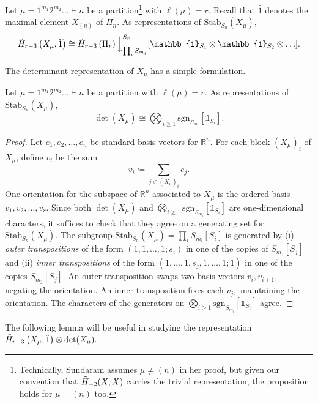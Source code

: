 \documentclass[ALCO, Unicode]{cedram}
\def\stab{\mathrm{Stab}}
\def\sgn{\mathrm{sgn}}
\begin{document}
\begin{prop}\label{prop:sundaram-Ln}
Let $\mu = 1^{m_1}2^{m_2}\ldots \vdash n$ be a {partition}\footnote{Technically, Sundaram assumes $\mu \neq (n)$ in her proof, but given our convention that $\Tilde{H}_{-2}(X, X)$ carries the trivial representation, the proposition holds for $\mu = (n)$ too.} with $\ell(\mu) = r.$ Recall that $\hat{1}$ denotes the maximal element $X_{(n)}$ of $\Pi_n.$ As representations of $\stab_{S_n}(X_\mu),$
\[\Tilde{H}_{r-3}\left(X_\mu, \hat{1}\right) \cong \Tilde{H}_{r - 3}\left(\Pi_r\right)\Big \downarrow^{S_r}_{\prod_{i} S_{m_i}}[\mathbb{1}_{S_1} \otimes \mathbb{1}_{S_2} \otimes \ldots].\]
\end{prop}


The determinant representation of $X_\mu$ has a simple formulation.

\begin{lemma}\label{lem:det(X_0/[n])}
    Let $\mu = 1^{m_1}2^{m_2}\ldots \vdash n$ be a partition with $\ell(\mu) = r.$ As representations of $\stab_{S_n}(X_\mu),$
\[\det(X_\mu) \cong \bigotimes_{i\geq1} \sgn_{S_{m_i}}[\mathbb{1}_{S_i}].\]

\end{lemma}
\begin{proof}
 Let $e_1, e_2, \ldots, e_n$ be standard basis vectors for $\mathbb{R}^n$. For each block $\left(X_{\mu}\right)_i$ of $X_\mu$, define $v_i$ be the sum \[v_i \coloneqq  \sum_{j \in \left(X_{\mu}\right)_i}e_j.\] 
 One orientation for the subspace of $\mathbb{R}^n$ associated to $X_\mu$ is the ordered basis $v_1, v_2, \ldots, v_r.$ Since both $\det(X_\mu)$ and $\bigotimes_{i \geq 1}\sgn_{S_{m_i}}[\mathbb{1}_{S_i}]$ are one-dimensional characters, it suffices to check that they agree on a generating set for $\stab_{S_n}(X_\mu).$ The subgroup $\stab_{S_n}(X_\mu) = \prod_i S_{m_i}[S_i]$ is generated by (i) \textit{outer transpositions} of the form $(1, 1, \ldots, 1; s_i)$ in one of the copies of $S_{m_j}[S_j]$ and (ii) \textit{inner transpositions} of the form $(1, \ldots, 1, s_j, 1, \ldots, 1; 1)$ in one of the copies $S_{m_j}[S_j].$  An outer transposition swaps two basis vectors $v_i, v_{i + 1},$ negating the orientation. An inner transposition fixes each $v_j,$ maintaining the orientation. The characters of the generators on $\bigotimes_{i \geq 1}\sgn_{S_{m_i}}[\mathbb{1}_{S_i}]$ agree. 
\end{proof}

The following lemma will be useful in studying the representation $\Tilde{H}_{r - 3}\left(X_\mu, \hat{1}\right) \otimes \det(X_\mu).$
\end{document}
